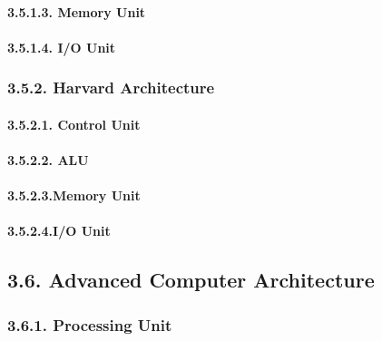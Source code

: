 \documentclass[
]{article}
\begin{document}
\hypertarget{memory-unit}{%
\paragraph{3.5.1.3. Memory Unit}\label{memory-unit}}

\hypertarget{io-unit}{%
\paragraph{3.5.1.4. I/O Unit}\label{io-unit}}

\hypertarget{harvard-architecture}{%
\subsubsection{3.5.2. Harvard Architecture}\label{harvard-architecture}}

\hypertarget{control-unit-1}{%
\paragraph{3.5.2.1. Control Unit}\label{control-unit-1}}

\hypertarget{alu-1}{%
\paragraph{3.5.2.2. ALU}\label{alu-1}}

\hypertarget{memory-unit-1}{%
\paragraph{3.5.2.3.Memory Unit}\label{memory-unit-1}}

\hypertarget{io-unit-1}{%
\paragraph{3.5.2.4.I/O Unit}\label{io-unit-1}}

\hypertarget{advanced-computer-architecture}{%
\subsection{3.6. Advanced Computer
Architecture}\label{advanced-computer-architecture}}

\hypertarget{processing-unit}{%
\subsubsection{3.6.1. Processing Unit}\label{processing-unit}}
\end{document}
